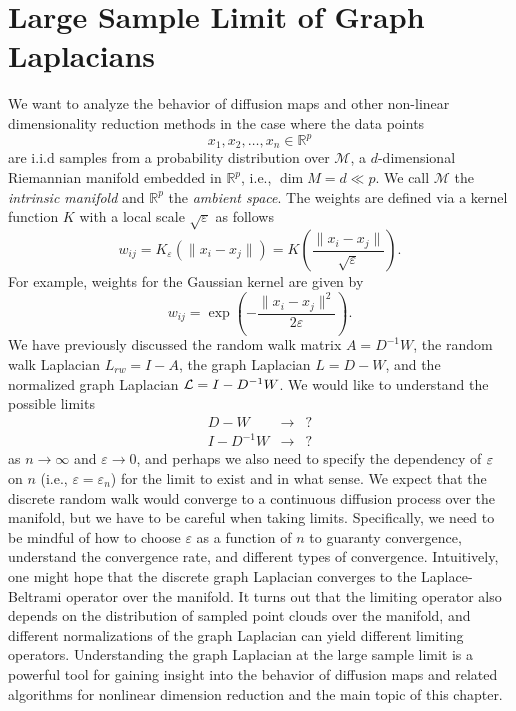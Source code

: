 \chapter{Large Sample Limit of Graph Laplacians}
\label{c:convergence}

We want to analyze the behavior of diffusion maps and other non-linear dimensionality reduction methods in the case where the data points $$x_1,x_2,\ldots,x_n \in \mathbb{R}^p$$ are i.i.d samples from a probability distribution over $\mathcal{M}$, a $d$-dimensional Riemannian manifold embedded in $\mathbb{R}^p$, i.e., $\operatorname{dim}M = d \ll p$. We call $\mathcal{M}$ the {\em intrinsic manifold} and $\mathbb{R}^p$ the {\em ambient space}. The weights are defined via a kernel function $K$ with a local scale $\sqrt{\varepsilon}$ as follows $$w_{ij} = K_{\varepsilon}(\|x_i - x_j \|) = K\left(\frac{\|x_i - x_j \|}{\sqrt{\varepsilon}}\right).$$  For example, weights for the Gaussian kernel are given by  $$w_{ij} = \exp{\left(-\frac{\|x_i - x_j\|^2}{2\varepsilon}\right)}.$$ We have previously discussed the random walk matrix $A = D^{-1}W$, the random walk Laplacian $L_{rw} = I - A$, the graph Laplacian $L = D - W$, and the normalized graph Laplacian $\mathcal{L} = I - D^{-1}W$. We would like to understand the possible limits
\begin{eqnarray*}
D - W &\to& ? \\
I - D^{-1}W &\to & ?
\end{eqnarray*}
as $n\to \infty$ and $\varepsilon \to 0$, and perhaps we also need to specify the dependency of $\varepsilon$ on $n$ (i.e., $\varepsilon = \varepsilon_n$) for the limit to exist and in what sense. We expect that the discrete random walk would converge to a continuous diffusion process over the manifold, but we have to be careful when taking limits. Specifically, we need to be mindful of how to choose $\varepsilon$ as a function of $n$ to guaranty convergence, understand the convergence rate, and different types of convergence. Intuitively, one might hope that the discrete graph Laplacian converges to the Laplace-Beltrami operator over the manifold. It turns out that the limiting operator also depends on the distribution of sampled point clouds over the manifold, and different normalizations of the graph Laplacian can yield different limiting operators. Understanding the graph Laplacian at the large sample limit is a powerful tool for gaining insight into the behavior of diffusion maps and related algorithms for nonlinear dimension reduction and the main topic of this chapter.     





